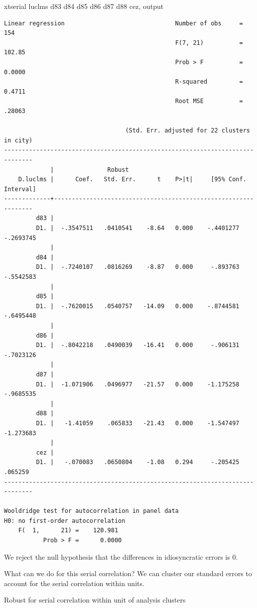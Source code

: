 \documentclass[
]{book}
\newenvironment{Shaded}{\begin{snugshade}}{\end{snugshade}}
\newcommand{\NormalTok}[1]{#1}
\begin{document}
\begin{Shaded}
\begin{Highlighting}[]
\NormalTok{xtserial luclms d83 d84 d85 d86 d87 d88 cez, output}
\end{Highlighting}
\end{Shaded}

\begin{verbatim}
Linear regression                               Number of obs     =        154
                                                F(7, 21)          =     102.85
                                                Prob > F          =     0.0000
                                                R-squared         =     0.4711
                                                Root MSE          =     .28063

                                  (Std. Err. adjusted for 22 clusters in city)
------------------------------------------------------------------------------
             |               Robust
    D.luclms |      Coef.   Std. Err.      t    P>|t|     [95% Conf. Interval]
-------------+----------------------------------------------------------------
         d83 |
         D1. |  -.3547511   .0410541    -8.64   0.000    -.4401277   -.2693745
             |
         d84 |
         D1. |  -.7240107   .0816269    -8.87   0.000     -.893763   -.5542583
             |
         d85 |
         D1. |  -.7620015   .0540757   -14.09   0.000    -.8744581   -.6495448
             |
         d86 |
         D1. |  -.8042218   .0490039   -16.41   0.000     -.906131   -.7023126
             |
         d87 |
         D1. |  -1.071906   .0496977   -21.57   0.000    -1.175258   -.9685535
             |
         d88 |
         D1. |   -1.41059    .065833   -21.43   0.000    -1.547497   -1.273683
             |
         cez |
         D1. |   -.070083   .0650804    -1.08   0.294     -.205425     .065259
------------------------------------------------------------------------------

Wooldridge test for autocorrelation in panel data
H0: no first-order autocorrelation
    F(  1,      21) =    120.981
           Prob > F =      0.0000
\end{verbatim}

We reject the null hypothesis that the differences in idiosyncratic errors is 0.

What can we do for this serial correlation? We can cluster our standard errors to account for the serial correlation within units.

Robust for serial correlation within unit of analysis clusters
\end{document}
